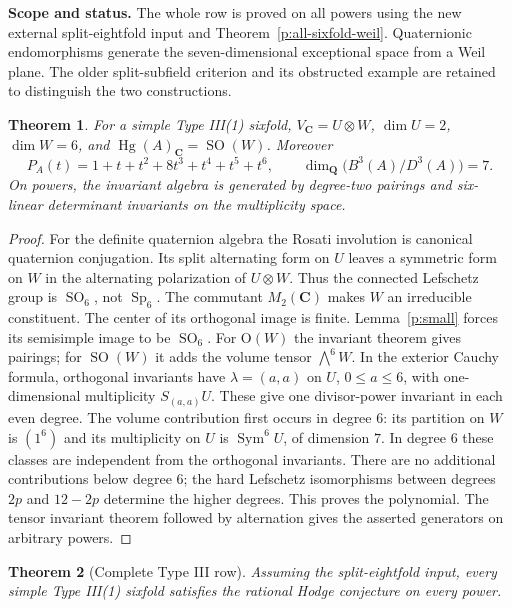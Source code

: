 \documentclass[11pt,reqno]{article}
\theoremstyle{emphasizedplain}
\newtheorem{theorem}{Theorem}[section]
\theoremstyle{emphasizeddefinition}
\theoremstyle{emphasizeddefinition}
\DeclareMathOperator{\Hg}{Hg}
\DeclareMathOperator{\Sp}{Sp}
\DeclareMathOperator{\SO}{SO}
\DeclareMathOperator{\Sym}{Sym}
\newcommand{\Q}{\mathbf Q}
\newcommand{\C}{\mathbf C}
\newcommand{\B}{B}
\newcommand{\D}{D}
\newcommand{\status}[1]{%
  \par\nobreak\smallskip\noindent
  {\setlength{\fboxsep}{7pt}%
   \colorbox{ScopeBackground}{%
    \parbox{\dimexpr\linewidth-2\fboxsep\relax}{%
     \small\textbf{\textcolor{HeadingInk}{Scope and status.}} #1}}}%
  \par\nobreak\medskip}
\begin{document}
\status{The whole row is proved on all powers using the new external
split-eightfold input and Theorem~\ref{p:all-sixfold-weil}.
Quaternionic endomorphisms generate the seven-dimensional exceptional
space from a Weil plane. The older split-subfield criterion and its
obstructed example are retained to distinguish the two constructions.}
\begin{theorem}\label{t:S7structure}
For a simple Type III(1) sixfold,
$V_\C=U\otimes W$, $\dim U=2$, $\dim W=6$, and
$\Hg(A)_\C=\SO(W)$. Moreover
\[
 P_A(t)=1+t+t^2+8t^3+t^4+t^5+t^6,
 \qquad\dim_\Q\bigl(\B^3(A)/\D^3(A)\bigr)=7.
\]
On powers, the invariant algebra is generated by degree-two pairings and
six-linear determinant invariants on the multiplicity space.
\end{theorem}
\begin{proof}
For the definite quaternion algebra the Rosati involution is canonical
quaternion conjugation. Its split alternating form on $U$ leaves a
symmetric form on $W$ in the alternating polarization of $U\otimes W$.
Thus the connected Lefschetz group is $\SO_6$, not $\Sp_6$.
The commutant $M_2(\C)$ makes $W$ an irreducible constituent.
The center of its orthogonal image is finite.
Lemma~\ref{p:small} forces its semisimple image to be $\SO_6$.
For $\mathrm O(W)$ the invariant theorem gives pairings; for $\SO(W)$ it
adds the volume tensor $\bigwedge^6 W$.
In the exterior Cauchy formula, orthogonal invariants have
$\lambda=(a,a)$ on $U$, $0\leq a\leq6$, with one-dimensional multiplicity
$S_{(a,a)}U$. These give one divisor-power invariant in each even degree.
The volume contribution first occurs in degree $6$: its partition on $W$
is $(1^6)$ and its multiplicity on $U$ is $\Sym^6 U$, of dimension $7$.
In degree $6$ these classes are independent from the orthogonal invariants.
There are no additional contributions below degree $6$; the hard Lefschetz
isomorphisms between degrees $2p$ and $12-2p$ determine the higher degrees.
This proves the polynomial. The tensor invariant theorem followed by
alternation gives the asserted generators on arbitrary powers.
\end{proof}
\begin{theorem}[Complete Type III row]\label{t:S7complete}
Assuming the split-eightfold input, every simple Type III(1) sixfold
satisfies the rational Hodge conjecture on every power.
\end{theorem}
\end{document}

